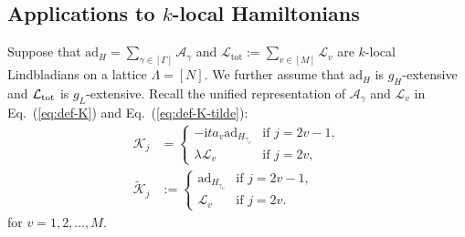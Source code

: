 \documentclass[aps,pra,reprint,groupedaddress,floatfix]{revtex4-2}
\newcommand{\eq}[1]{(\ref{eq:#1})}
\renewcommand{\i}{\mathrm{i}}
\renewcommand{\L}{\mathcal{L}}
\newcommand{\ad}{\mathrm{ad}}
\newcommand{\A}{\mathcal{A}}
\newcommand{\tot}{\mathrm{tot}}
\newcommand{\mc}{\mathcal}
\begin{document}
\subsection{Applications to $k$-local Hamiltonians}
\label{sec:local}
Suppose that $\ad_H=\sum_{\gamma\in[\Gamma]}\A_\gamma$ and $\mc L_{\tot}:=\sum_{v\in [M]}\mc L_v$ are $k$-local Lindbladians on a lattice $\Lambda = [N]$. We further assume that $\ad_H$ is $g_H$-extensive and $\L_{\rm tot}$ is $g_L$-extensive.
Recall the unified representation of $\mc A_{\gamma}$ and $\mc L_v$ in Eq.~\eq{def-K} and Eq.~\eq{def-K-tilde}: \begin{align*}
    \mathcal{K}_j
    &=
    \begin{cases}
        -\i ta_{v}\ad_{H_{\gamma_v}} & \text{if } j = 2v-1, \\
        \lambda\mathcal{L}_v & \text{if } j = 2v,
    \end{cases} \\
    \tilde{\mathcal{K}}_j
    &:=
    \begin{cases}
        \ad_{H_{\gamma_v}} & \text{if } j = 2v-1,\\
        \mathcal{L}_v & \text{if } j = 2v.
    \end{cases} 
\end{align*}
for $v=1, 2,\ldots, M$.  
\end{document}
